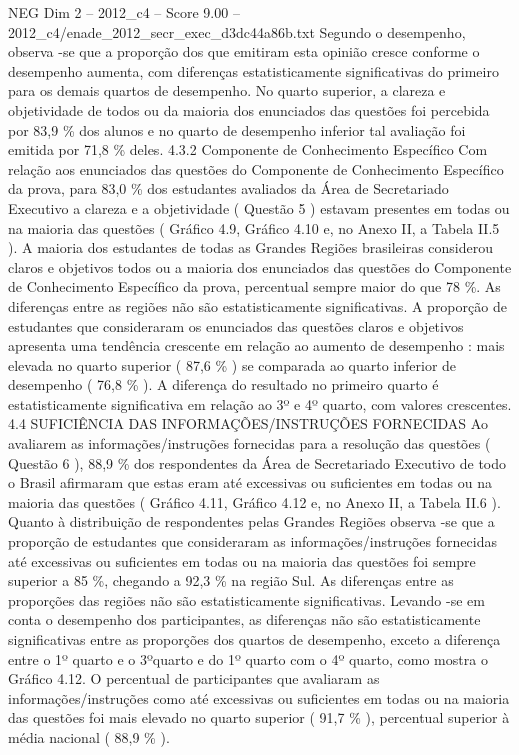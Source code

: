\begin{textsample}{NEG Dim 2 – 2012\_c4 – Score 9.00 – 2012\_c4/enade\_2012\_secr\_exec\_d3dc44a86b.txt}
Segundo o desempenho, observa -se que a proporção dos que emitiram esta opinião cresce conforme o desempenho aumenta, com diferenças estatisticamente significativas do primeiro para os demais quartos de desempenho.
No quarto superior, a clareza e objetividade de todos ou da maioria dos enunciados das questões foi percebida por 83,9 \% dos alunos e no quarto de desempenho inferior tal avaliação foi emitida por 71,8 \% deles. 4.3.2 Componente de Conhecimento Específico Com relação aos enunciados das questões do Componente de Conhecimento Específico da prova, para 83,0 \% dos estudantes avaliados da Área de Secretariado Executivo a clareza e a objetividade ( Questão 5 ) estavam presentes em todas ou na maioria das questões ( Gráfico 4.9, Gráfico 4.10 e, no Anexo II, a Tabela II.5 ).
A maioria dos estudantes de todas as Grandes Regiões brasileiras considerou claros e objetivos todos ou a maioria dos enunciados das questões do Componente de Conhecimento Específico da prova, percentual sempre maior do que 78 \%.
As diferenças entre as regiões não são estatisticamente significativas.
A proporção de estudantes que consideraram os enunciados das questões claros e objetivos apresenta uma tendência crescente em relação ao aumento de desempenho : mais elevada no quarto superior ( 87,6 \% ) se comparada ao quarto inferior de desempenho ( 76,8 \% ).
A diferença do resultado no primeiro quarto é estatisticamente significativa em relação ao 3º e 4º quarto, com valores crescentes. 4.4 SUFICIÊNCIA DAS INFORMAÇÕES/INSTRUÇÕES FORNECIDAS Ao avaliarem as informações/instruções fornecidas para a resolução das questões ( Questão 6 ), 88,9 \% dos respondentes da Área de Secretariado Executivo de todo o Brasil afirmaram que estas eram até excessivas ou suficientes em todas ou na maioria das questões ( Gráfico 4.11, Gráfico 4.12 e, no Anexo II, a Tabela II.6 ).
Quanto à distribuição de respondentes pelas Grandes Regiões observa -se que a proporção de estudantes que consideraram as informações/instruções fornecidas até excessivas ou suficientes em todas ou na maioria das questões foi sempre superior a 85 \%, chegando a 92,3 \% na região Sul.
As diferenças entre as proporções das regiões não são estatisticamente significativas.
Levando -se em conta o desempenho dos participantes, as diferenças não são estatisticamente significativas entre as proporções dos quartos de desempenho, exceto a diferença entre o 1º quarto e o 3ºquarto e do 1º quarto com o 4º quarto, como mostra o Gráfico 4.12.
O percentual de participantes que avaliaram as informações/instruções como até excessivas ou suficientes em todas ou na maioria das questões foi mais elevado no quarto superior ( 91,7 \% ), percentual superior à média nacional ( 88,9 \% ).

\end{textsample}
